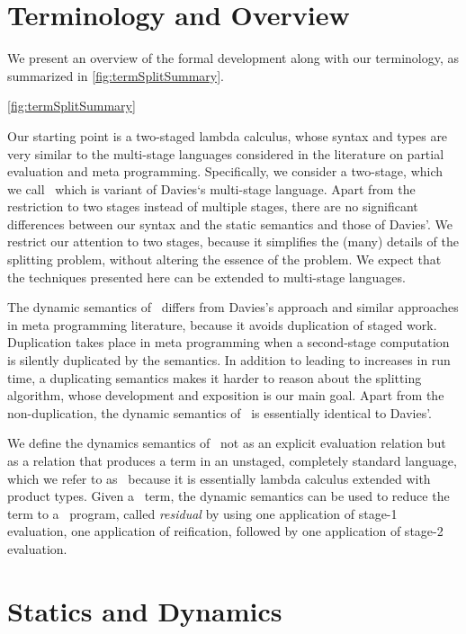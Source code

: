 \section{Terminology and Overview}



We present an overview of the formal development along with our
terminology, as summarized in \ref{fig:termSplitSummary}.

\ref{fig:termSplitSummary}

Our starting point is a two-staged lambda calculus, whose syntax and
types are very similar to the multi-stage languages considered in the
literature on partial evaluation and meta programming.  Specifically,
we consider a two-stage, which we call \lang\, which is variant of
Davies`s multi-stage language.  Apart from the restriction to two
stages instead of multiple stages, there are no significant
differences between our syntax and the static semantics and those of
Davies'. We restrict our attention to two stages, because it
simplifies the (many) details of the splitting problem, without
altering the essence of the problem.  We expect that the techniques
presented here can be extended to multi-stage languages.

The dynamic semantics of \lang\ differs from Davies's approach and
similar approaches in meta programming literature, because it avoids
duplication of staged work. Duplication takes place in meta
programming when a second-stage computation is silently duplicated by
the semantics.  In addition to leading to increases in run time, a
duplicating semantics makes it harder to reason about the splitting
algorithm, whose development and exposition is our main goal.  Apart
from the non-duplication, the dynamic semantics of \lang\ is
essentially identical to  Davies'. 


We define the dynamics semantics of \lang\ not as an explicit
evaluation relation but as a relation that produces a term in an
unstaged, completely standard language, which we refer to as
\langmono\, because it is essentially lambda calculus extended with
product types. Given a \lang\ term, the dynamic semantics can be used
to reduce the term to a \langmono\ program, called {\em residual} by
using one application of stage-1 evaluation, one application of
reification, followed by one application of stage-2 evaluation.




\section{\texorpdfstring{\lang}{λ12} Statics and Dynamics}
\label{sec:semantics}

